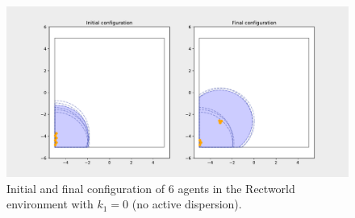\begin{figure}[H]
  \centering
  \includegraphics[width=\textwidth]{figs/bigworld_6_agnt_k_1_0_k_2_1_distr.pdf}
  \caption{Initial and final configuration of 6 agents in the Rectworld environment with $k_{1} = 0$ (no active dispersion).}
  \label{fig:6_agnt_bw_k_1_0_k_2_1_distr}
\end{figure}
